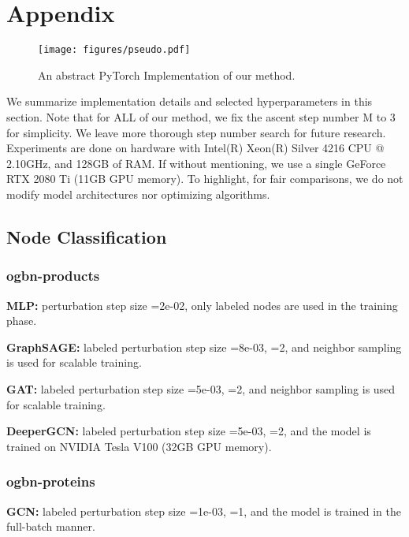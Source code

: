 \documentclass[11pt]{article}
\begin{document}
\clearpage
\newpage


\clearpage
\newpage
\appendix
\section{Appendix}
\label{appendix}

\begin{figure}[h]\centering
    \texttt{[image: figures/pseudo.pdf]} \caption{An abstract PyTorch Implementation of our method.}\label{fig:pseudo}\end{figure}



We summarize implementation details and selected hyperparameters in this section. Note that for ALL of our method, we fix the ascent step number M to 3 for simplicity. We leave more thorough step number search for future research. Experiments are done on hardware with Intel(R) Xeon(R) Silver 4216 CPU @ 2.10GHz, and 128GB of RAM. If without mentioning, we use a single GeForce RTX 2080 Ti (11GB GPU memory). To highlight, for fair comparisons, we do not modify model architectures nor optimizing algorithms.

\subsection{Node Classification}

\subsubsection{ogbn-products}

\textbf{MLP:} perturbation step size =2e-02, only labeled nodes are used in the training phase.

\textbf{GraphSAGE:} labeled perturbation step size =8e-03, =2, and neighbor sampling is used for scalable training.

\textbf{GAT:} labeled perturbation step size =5e-03, =2, and neighbor sampling is used for scalable training.

\textbf{DeeperGCN:} labeled perturbation step size =5e-03, =2, and the model is trained on NVIDIA Tesla V100 (32GB GPU memory).

\subsubsection{ogbn-proteins}

\textbf{GCN:} labeled perturbation step size =1e-03, =1, and the model is trained in the full-batch manner.
\end{document}
